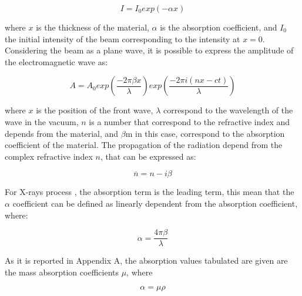 \begin{equation}
I = I_0 exp(-\alpha x)
\label{eq: intensity}
\end{equation}

\begin{flushleft}
where $x $ is the thickness of the material, $\alpha$ is the absorption coefficient, and $I_0$ the initial intensity of the beam corresponding to the intensity at $x=0$. Considering the beam as   a plane wave, it is possible to express the  amplitude of the electromagnetic wave as:
\end{flushleft}

\begin{equation}
A=A_0exp(\frac{-2 \pi \beta x}{\lambda})exp(\frac{-2 \pi i (nx-ct)}{\lambda})
\label{eq: amplitude}
\end{equation}

\begin{flushleft}
where $x$ is the position of the front wave, $\lambda$ correspond to the wavelength of the wave in the vacuum, $n $ is a number that correspond to the refractive index and depends from the material, and $\beta $m in this case, correspond to the absorption coefficient of the material. The propagation of the radiation depend from the complex refractive index $n $, that can be expressed as: 
\end{flushleft}

\begin{equation}
\overline{n} = n - i \beta
\label{eq: n_comlex}
\end{equation}

\begin{flushleft}
For X-rays process , the absorption term is the leading term, this mean that the $\alpha$ coefficient can be defined as linearly dependent from the absorption coefficient, where:
\end{flushleft}

\begin{equation}
\alpha = \frac{4 \pi \beta}{\lambda}
\label{eq: alpha1}
\end{equation}

\begin{flushleft}
As it is reported in Appendix A, the absorption values tabulated are given are the mass absorption coefficients $\mu$, where
\end{flushleft}

\begin{equation}
\alpha = \mu \rho
\label{eq: alpha2}
\end{equation}

